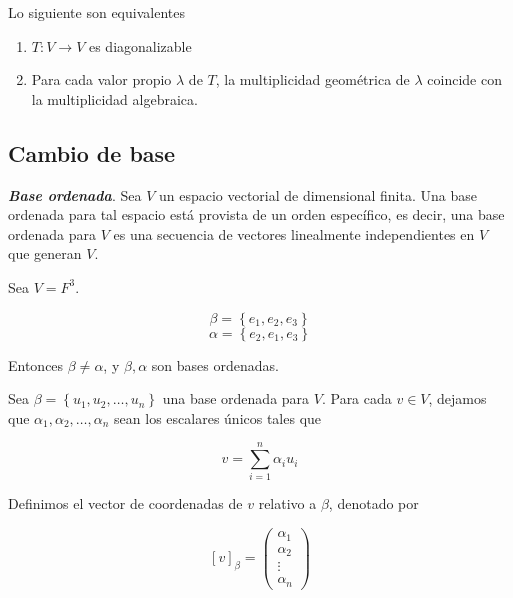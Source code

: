 \documentclass{report}
\begin{document}
    \begin{thBox}
        Lo siguiente son equivalentes

        \begin{enumerate}
            \item $T: V \to V$ es diagonalizable
            \item Para cada valor propio $\lambda$ de $T$, la multiplicidad geométrica de $\lambda$ coincide con la multiplicidad algebraica.
        \end{enumerate}
    \end{thBox}
    
    \subsection*{Cambio de base}
    
    \begin{defBox}
        \textit{\textbf{Base ordenada}}. Sea $V$ un espacio vectorial de dimensional finita. Una base ordenada para tal espacio está provista de un orden específico, es decir, una base ordenada para $V$ es una secuencia de vectores linealmente independientes en $V$ que generan $V$.
    \end{defBox}
    
    \begin{Example}
        Sea $V = F^3$.

        $$\beta = \left\{ e_1, e_2, e_3 \right\}$$
        $$\alpha = \left\{ e_2, e_1, e_3 \right\}$$

        Entonces $\beta \not = \alpha$, y $\beta, \alpha$ son bases ordenadas.
    \end{Example}
    
    \begin{defBox}
        Sea $\beta = \left\{ u_1, u_2, \dots , u_n \right\}$ una base ordenada para $V$. Para cada $v \in V$, dejamos que $\alpha_1, \alpha_2, \dots , \alpha_n$ sean los escalares únicos tales que

        $$v = \sum_{i=1}^{n}\alpha_iu_i$$

        Definimos el vector de coordenadas de $v$ relativo a $\beta$, denotado por

        $$[v]_\beta = \begin{pmatrix}
            \alpha_1\\ \alpha_2 \\ \vdots \\ \alpha_n
        \end{pmatrix}$$
    \end{defBox}
    
\end{document}
